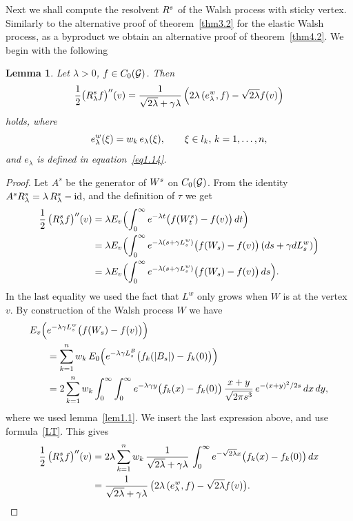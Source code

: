 \documentclass[11pt,a4paper]{amsart}
\renewcommand{\gg}{\gamma}
\newcommand{\gl}{\lambda}
\newcommand{\cG}{\mathcal{G}}
\newcommand{\1}{1}
\newtheorem{lemma}[theorem]{Lemma}
\theoremstyle{remark}
\newcommand{\sgl}{\ensuremath\sqrt{2\gl}}
\newcommand{\Co}{\ensuremath C_0(\cG)}
\newcommand{\kn}{\ensuremath k=1,\dotsc,n}
\newcommand{\Ws}{\ensuremath W^s}
\newcommand{\RsW}{\ensuremath R^s}
\numberwithin{equation}{section}
\begin{document}
Next we shall compute the resolvent $\RsW$ of the Walsh process with sticky vertex.
Similarly to the alternative proof of theorem~\ref{thm3.2} for the elastic Walsh
process, as a byproduct we obtain an alternative proof of theorem~\ref{thm4.2}. We
begin with the following

\begin{lemma}   \label{lem4.5}
Let $\gl>0$, $f\in \Co$. Then
\begin{equation}    \label{eq4.8}
    \frac{1}{2} \bigl(\RsW_\gl f\bigr)''(v)
        = \frac{1}{\sgl +\gg\gl}\,\Bigl(2\gl\,(e^w_\gl,f) - \sgl f(v)\Bigr)
\end{equation}
holds, where
\begin{equation}    \label{eq4.9}
    e^w_\gl(\xi) = w_k\,e_\gl(\xi),\qquad \xi\in l_k,\,\kn,
\end{equation}
and $e_\gl$ is defined in equation~\eqref{eq1.14}.
\end{lemma}

\begin{proof}
Let $A^s$ be the generator of $\Ws$ on $\Co$. From the identity $A^s \RsW_\gl =
\gl\,\RsW_\gl -\text{id}$, and the definition of $\tau$ we get
\begin{align*}
    \frac{1}{2}\,\bigl(\RsW_\gl f\bigr)''(v)
        &= \gl E_v\Bigl(\int_0^\infty e^{-\gl t}\bigl(f(\Ws_t)-f(v)\bigr)\,dt\Bigr)\\
        &= \gl E_v\Bigl(\int_0^\infty e^{-\gl(s+\gg L^w_s)}
            \bigl(f(W_s)-f(v)\bigr)\,(ds + \gg dL^w_s)\Bigr)\\
        &= \gl E_v\Bigl(\int_0^\infty e^{-\gl(s+\gg L^w_s)}
            \bigl(f(W_s)-f(v)\bigr)\,ds \Bigr).
\end{align*}
In the last equality we used the fact that $L^w$ only grows when $W$ is at the vertex~$v$.
By construction of the Walsh process $W$ we have
\begin{align*}
    E_v\Bigl(&e^{-\gl\gg L^w_s}\bigl(f(W_s)-f(v)\bigr)\Bigr)\\
        &= \sum_{k=1}^n w_k\,E_0\Bigl(e^{-\gl\gg L^B_s}
                \bigl(f_k(|B_s|) - f_k(0)\bigr) \Bigr)\\
        &= 2\sum_{k=1}^n w_k \int_0^\infty \int_0^\infty e^{-\gl\gg y}
                \bigl(f_k(x) - f_k(0)\bigr)\,\frac{x+y}{\sqrt{2\pi s^3}}\,
                    e^{-(x+y)^2/2s}\,dx\,dy,
\end{align*}
where we used lemma~\ref{lem1.1}. We insert the last expression above, and
use formula~\eqref{LT}. This gives
\begin{align*}
    \frac{1}{2}\,\bigl(\RsW_\gl f\bigr)''(v)
        &= 2\gl \sum_{k=1}^n w_k\,\frac{1}{\sgl + \gg\gl}\,
            \int_0^\infty e^{-\sgl x}\bigl(f_k(x)-f_k(0)\bigr)\,dx\\
        &= \frac{1}{\sgl+\gg\gl}\,\bigl(2\gl\,(e^w_\gl,f) - \sgl f(v)\bigr). \qedhere
\end{align*}
\end{proof}
\end{document}
